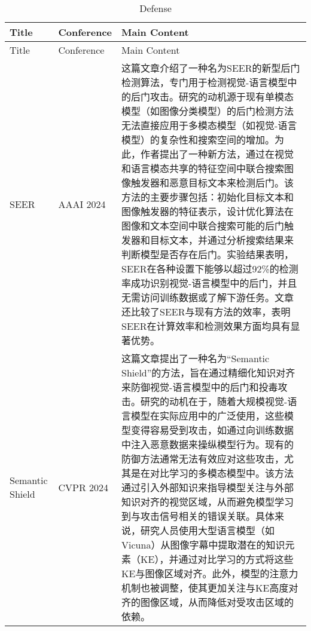 \documentclass[lettersize,journal]{IEEEtran}
\begin{document}
\begin{longtable}{|p{3.5cm}|p{2cm}|p{10.5cm}|}
\end{longtable}

\newpage
\onecolumn
\begin{longtable}{|p{3.5cm}|p{2cm}|p{10.5cm}|} 
    \caption{Defense}
    \label{table:defense} \\ \hline
    Title & Conference & Main Content \\ \hline
    \endfirsthead \hline
    Title & Conference & Main Content \\ \hline 
    \endhead \hline
    SEER\cite{zhu2024seer} & AAAI 2024 & 这篇文章介绍了一种名为SEER的新型后门检测算法，专门用于检测视觉-语言模型中的后门攻击。研究的动机源于现有单模态模型（如图像分类模型）的后门检测方法无法直接应用于多模态模型（如视觉-语言模型）的复杂性和搜索空间的增加。为此，作者提出了一种新方法，通过在视觉和语言模态共享的特征空间中联合搜索图像触发器和恶意目标文本来检测后门。该方法的主要步骤包括：初始化目标文本和图像触发器的特征表示，设计优化算法在图像和文本空间中联合搜索可能的后门触发器和目标文本，并通过分析搜索结果来判断模型是否存在后门。实验结果表明，SEER在各种设置下能够以超过92\%的检测率成功识别视觉-语言模型中的后门，并且无需访问训练数据或了解下游任务。文章还比较了SEER与现有方法的效率，表明SEER在计算效率和检测效果方面均具有显著优势。\\ \hline

    Semantic Shield\cite{ishmam2024semantic} & CVPR 2024 & 这篇文章提出了一种名为“Semantic Shield”的方法，旨在通过精细化知识对齐来防御视觉-语言模型中的后门和投毒攻击。研究的动机在于，随着大规模视觉-语言模型在实际应用中的广泛使用，这些模型变得容易受到攻击，如通过向训练数据中注入恶意数据来操纵模型行为。现有的防御方法通常无法有效应对这些攻击，尤其是在对比学习的多模态模型中。该方法通过引入外部知识来指导模型关注与外部知识对齐的视觉区域，从而避免模型学习到与攻击信号相关的错误关联。具体来说，研究人员使用大型语言模型（如Vicuna）从图像字幕中提取潜在的知识元素（KE），并通过对比学习的方式将这些KE与图像区域对齐。此外，模型的注意力机制也被调整，使其更加关注与KE高度对齐的图像区域，从而降低对受攻击区域的依赖。\\ \hline


\end{longtable}
\end{document}
